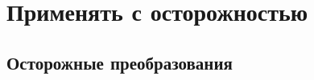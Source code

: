 \hypertarget{unsafe}{%
\section{Применять с осторожностью}\label{unsafe:chapter}}

\hypertarget{unsafe-conversions}{%
\subsection{Осторожные преобразования}\label{unsafe:conversions}}



